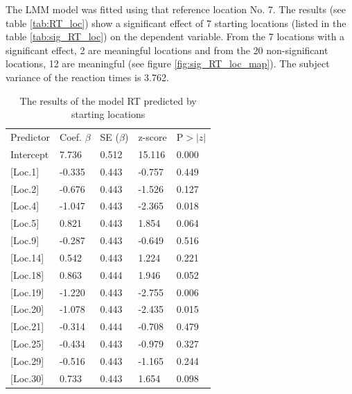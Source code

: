 The LMM model was fitted using that reference location No. 7. The results (see table \ref{tab:RT_loc}) show a significant effect of 7 starting locations (listed in the table \ref{tab:sig_RT_loc}) on the dependent variable. From the 7 locations with a significant effect, 2 are meaningful locations and from the 20 non-significant locations, 12 are meaningful (see figure \ref{fig:sig_RT_loc_map}). The subject variance of the reaction times is 3.762.


\begin{longtable}{p{4cm}p{2cm}p{2cm}p{2cm}l}
	\hiderowcolors
	\caption[RT predicted by starting locations]{The results of the model RT predicted by starting locations} \\
	\hline \hline
	\multicolumn{1}{l}{Predictor} & \multicolumn{1}{l}{Coef. $\beta$} & \multicolumn{1}{l}{SE ($\beta$)} & \multicolumn{1}{l}{z-score} & \multicolumn{1}{r}{P$>|z|$} \\
	\hline \hline
	\showrowcolors
	Intercept       & 7.736  & 0.512 & 15.116 & 0.000 \\
	{[}Loc.1{]}     & -0.335 & 0.443 & -0.757 & 0.449 \\
	{[}Loc.2{]}     & -0.676 & 0.443 & -1.526 & 0.127 \\
	 \setrow{\bfseries} {[}Loc.4{]}     & \setrow{\bfseries}  -1.047 & \setrow{\bfseries}  0.443 & \setrow{\bfseries}  -2.365 & \setrow{\bfseries}  0.018  \\
	{[}Loc.5{]}     & 0.821  & 0.443 & 1.854  & 0.064 \\
	{[}Loc.9{]}     & -0.287 & 0.443 & -0.649 & 0.516 \\
	{[}Loc.14{]}    & 0.542  & 0.443 & 1.224  & 0.221 \\
	{[}Loc.18{]}    & 0.863  & 0.444 & 1.946  & 0.052 \\
	 \setrow{\bfseries} {[}Loc.19{]}    & \setrow{\bfseries}  -1.220 & \setrow{\bfseries}  0.443 & \setrow{\bfseries}  -2.755 & \setrow{\bfseries}  0.006  \\
	 \setrow{\bfseries} {[}Loc.20{]}    & \setrow{\bfseries}  -1.078 & \setrow{\bfseries}  0.443 & \setrow{\bfseries}  -2.435 & \setrow{\bfseries}  0.015 \\
	{[}Loc.21{]}    & -0.314 & 0.444 & -0.708 & 0.479 \\
	{[}Loc.25{]}    & -0.434 & 0.443 & -0.979 & 0.327 \\
	{[}Loc.29{]}    & -0.516 & 0.443 & -1.165 & 0.244 \\
	{[}Loc.30{]}    & 0.733  & 0.443 & 1.654  & 0.098 \\

\end{longtable}
